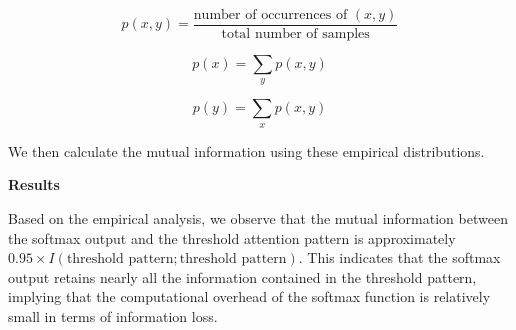 \begin{equation}






p(x, y) = \frac{\text{number of occurrences of } (x, y)}{\text{total number of samples}}






\end{equation}






\begin{equation}






p(x) = \sum_{y} p(x, y)






\end{equation}






\begin{equation}






p(y) = \sum_{x} p(x, y)






\end{equation}













We then calculate the mutual information using these empirical distributions.













\textbf{Results}













Based on the empirical analysis, we observe that the mutual information between the softmax output and the threshold attention pattern is approximately \(0.95 \times I(\text{threshold pattern}; \text{threshold pattern})\). This indicates that the softmax output retains nearly all the information contained in the threshold pattern, implying that the computational overhead of the softmax function is relatively small in terms of information loss.













